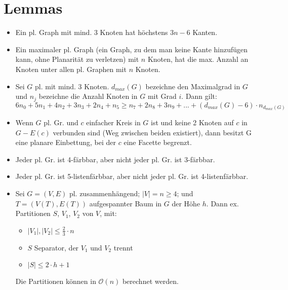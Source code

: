 \documentclass[a4paper,11pt]{report}
\begin{document}
\chapter{Lemmas}
\begin{itemize}
    \item Ein pl. Graph mit mind. 3 Knoten hat höchstens $3n-6$ Kanten.
    \item Ein maximaler pl. Graph (ein Graph, zu dem man keine Kante hinzufügen kann, ohne Planarität zu verletzen) mit $n$ Knoten, hat die max. Anzahl an Knoten unter allen pl. Graphen mit $n$ Knoten.
    \item Sei $G$ pl. mit mind. 3 Knoten. $d_{max}(G)$ bezeichne den Maximalgrad in $G$ und $n_j$ bezeichne die Anzahl Knoten in $G$ mit Grad $i$. Dann gilt: \[6 n_0 + 5 n_1 + 4 n_2 + 3 n_3 + 2 n_4 + n_5 \geq n_7 + 2 n_8 + 3 n_9 + ... + (d_{max}(G) - 6) \cdot n_{d_{max}(G)}\]
    \item Wenn $G$ pl. Gr. und $c$ einfacher Kreis in $G$ ist und keine 2 Knoten auf $c$ in $G - E(c)$ verbunden sind (Weg zwischen beiden existiert), dann besitzt G eine planare Einbettung, bei der $c$ eine Facette begrenzt.
    \item Jeder pl. Gr. ist 4-färbbar, aber nicht jeder pl. Gr. ist 3-färbbar.
    \item Jeder pl. Gr. ist 5-listenfärbbar, aber nicht jeder pl. Gr. ist 4-listenfärbbar.
    \item Sei $G = (V, E)$ pl. zusammenhängend; $|V| = n \geq 4$; und $T = (V(T), E(T))$ aufgespannter Baum in $G$ der Höhe $h$. Dann ex. Partitionen $S$, $V_1$, $V_2$ von $V$, mit:
    \begin{itemize}
        \item $|V_1|, |V_2| \leq \frac{2}{3} \cdot n$
        \item $S$ Separator, der $V_1$ und $V_2$ trennt
        \item $|S| \leq 2 \cdot h + 1$
    \end{itemize}
    Die Partitionen können in $\mathcal{O}(n)$ berechnet werden.
\end{itemize}


\glsaddallunused
\printglossaries
\end{document}
